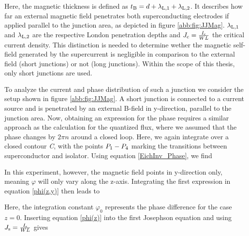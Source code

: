 
Here, the magnetic thickness is defined as $t_{\rm B} = d + \lambda_{\rm L,1} + \lambda_{\rm L,2}$. It describes how far an external magnetic field penetrates both superconducting electrodes if applied parallel to the junction area, as depicted in figure \ref{abb:fig:JJMag}. $\lambda_{\rm L,1}$ and $\lambda_{\rm L,2}$ are the respective London penetration depths and $J_{\rm c} = \frac{I_{\rm c}}{WL}$ the critical current density.
This distinction is needed to determine wether the magnetic self-field generated by the supercurrent is negligible in comparison to the external field (short junctions) or not (long junctions). Within the scope of this thesis, only short junctions are used.  

To analyze the current and phase distribution of such a junction we consider the setup shown in figure \ref{abb:fig:JJMag}. A short junction is connected to a current source and is penetrated by an external B-field in y-direction, parallel to the junction area. Now, obtaining an expression for the phase requires a similar approach as the calculation for the quantized flux, where we assumed that the phase changes by $2\pi n$ around a closed loop. Here, we again integrate over a closed contour \textit{C}, with the points $P_{\rm 1}-P_{\rm 4}$ marking the transitions between superconductor and isolator. Using equation \ref{EichInv_Phase}, we find 


In this experiment, however, the magnetic field points in y-direction only, meaning $\varphi$ will only vary along the z-axis. Integrating the first expression in equation \ref{phi(z,y)} then leads to


Here, the integration constant $\varphi_0$ represents the phase difference for the case $z=0$. Inserting equation \ref{phi(z)} into the first Josephson equation and using $J_{\rm s} = \frac{I_{\rm s}}{WL}$ gives 



